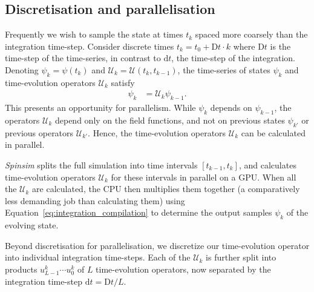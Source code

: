 \documentclass{jors}
\begin{document}
	\subsection{Discretisation and parallelisation}
		Frequently we wish to sample the state at times $ t_k $ spaced more coarsely than the integration time-step.
		Consider discrete times $ t_k = t_0 + \mathrm{D}t\cdot k $ where $ \mathrm{D}t $ is the time-step of the time-series, in contrast to $ \mathrm{d}t $, the time-step of the integration.
		Denoting $ \psi_k = \psi(t_k) $ and $ \mathcal{U}_k = \mathcal{U}(t_{k}, t_{k-1}) $, the time-series of states $  \psi_k $ and time-evolution operators $ \mathcal{U}_k $ satisfy
		\begin{align}
			\psi_k &= \mathcal{U}_k\psi_{k-1}.\label{eq:integration_compilation}
		\end{align}
		This presents an opportunity for parallelism.
		While $ \psi_k $ depends on $ \psi_{k-1} $, the operators $ \mathcal{U}_k $ depend only on the field functions, and not on previous states $ \psi_{k'} $ or previous operators $ \mathcal{U}_{k'} $.
		Hence, the time-evolution operators $ \mathcal{U}_k $ can be calculated in parallel.

		\emph{Spinsim} splits the full simulation into time intervals $ [t_{k - 1}, t_{k}] $, and calculates time-evolution operators $ \mathcal{U}_k $ for these intervals in parallel on a GPU. %
		When all the $ \mathcal{U}_k $ are calculated, the CPU then multiplies them together (a comparatively less demanding job than calculating them) using Equation~\eqref{eq:integration_compilation} to determine the output samples $ \psi_k $ of the evolving state.

		Beyond discretisation for parallelisation, we discretize our time-evolution operator into individual integration time-steps.
		Each of the $ \mathcal{U}_k $ is further split into products $ u^k_{L-1} \cdots u^k_0 $ of $ L $ time-evolution operators, now separated by the integration time-step $ \mathrm{d}t = \mathrm{D}t/L $.
		
\end{document}
